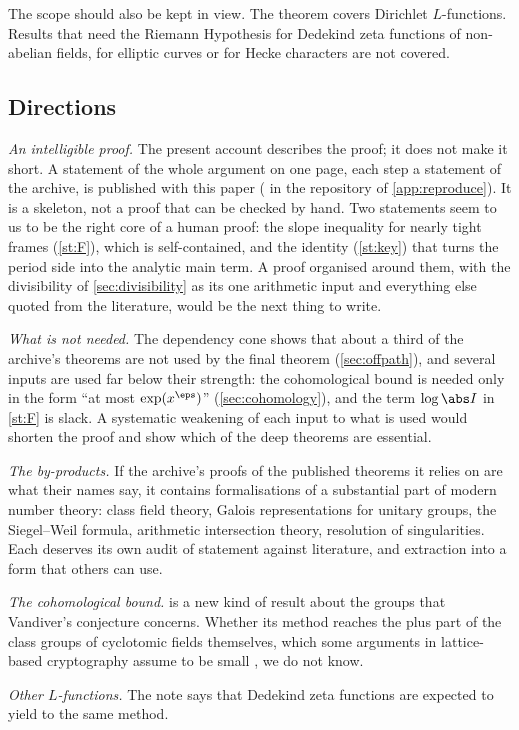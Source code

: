 The scope should also be kept in view. The theorem covers Dirichlet $L$-functions. Results
that need the Riemann Hypothesis for Dedekind zeta functions of non-abelian fields, for
elliptic curves or for Hecke characters are not covered.

\subsection{Directions}
\emph{An intelligible proof.} The present account describes the proof; it does not make it
short. A statement of the whole argument on one page, each step a statement of the archive, is
published with this paper ( in the repository of \cref{app:reproduce}). It
is a skeleton, not a proof that can be checked by hand. Two statements seem to us to be the
right core of a human proof: the slope inequality
for nearly tight frames (\cref{st:F}), which is self-contained, and the identity
(\cref{st:key}) that turns the period side into the analytic main term. A proof organised
around them, with the divisibility of \cref{sec:divisibility} as its one arithmetic input and
everything else quoted from the literature, would be the next thing to write.

\emph{What is not needed.} The dependency cone shows that about a third of the archive's
theorems are not used by the final theorem (\cref{sec:offpath}), and several inputs are used far below their
strength: the cohomological bound is needed only in the form ``at most $\exp(x^\eps)$''
(\cref{sec:cohomology}), and the term $\log\abs I$ in \cref{st:F} is slack. A systematic
weakening of each input to what is used would shorten the proof and show which of the deep
theorems are essential.

\emph{The by-products.} If the archive's proofs of the published theorems it relies on are what
their names say, it contains formalisations of a substantial part of modern number theory:
class field theory, Galois representations for unitary groups, the Siegel--Weil formula,
arithmetic intersection theory, resolution of singularities. Each deserves its own audit of
statement against literature, and extraction into a form that others can use.

\emph{The cohomological bound.}  is a new kind of result about the groups that
Vandiver's conjecture concerns. Whether its method reaches the plus part of the class groups of
cyclotomic fields themselves, which some arguments in lattice-based cryptography assume to be
small \cite{cdpr2016}, we do not know.

\emph{Other $L$-functions.} The note says that Dedekind zeta functions are expected to yield to
the same method.
